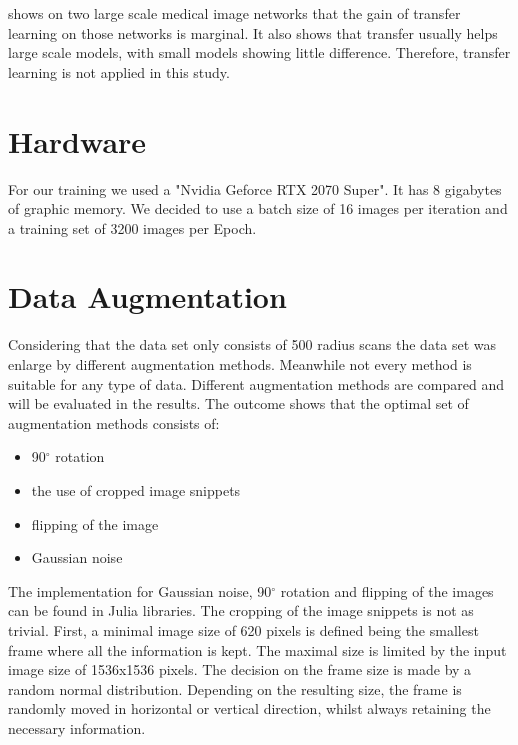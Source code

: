 \documentclass[
a4paper, 
12pt,
grayscalebody, %
abstract=on,
twoside, BCOR10mm, 12pt, DIV13,headinclude, footexclude, final, abstracton, openright
]{ibireprt}
\numberwithin{equation}{chapter}
\numberwithin{table}{chapter}
\numberwithin{figure}{chapter}
\numberwithin{algorithm}{chapter}
\numberwithin{example}{chapter}
\numberwithin{example}{chapter}
\begin{document}
\citet{Raghu2019} shows on two large scale medical image networks that the gain of transfer learning on those networks is marginal. It also shows that transfer usually helps large scale models, with small models showing little difference. Therefore, transfer learning is not applied in this study.

\section{Hardware}
For our training we used a "Nvidia Geforce RTX 2070 Super". It has 8 gigabytes of graphic memory. We decided to use a batch size of 16 images per iteration and a training set of 3200 images per Epoch. 

\section{Data Augmentation}
Considering that the data set only consists of 500 radius scans the data set was enlarge by different augmentation methods. Meanwhile not every method is suitable for any type of data. Different augmentation methods are compared and will be evaluated in the results. The outcome shows that the optimal set of augmentation methods consists of:

\begin{itemize}
	\item 90$^{\circ}$ rotation
		\item the use of cropped image snippets 
	\item flipping of the image
	\item Gaussian noise

\end{itemize}

The implementation for Gaussian noise, 90$^{\circ}$ rotation and flipping of the images can be found in Julia libraries. The cropping of the image snippets is not as trivial. First, a minimal image size of 620 pixels is defined being the smallest frame where all the information is kept. The maximal size is limited by the input image size of 1536x1536 pixels. The decision on the frame size is made by a random normal distribution. Depending on the resulting size, the frame is randomly moved in horizontal or vertical direction, whilst always retaining the necessary information.
\end{document}
